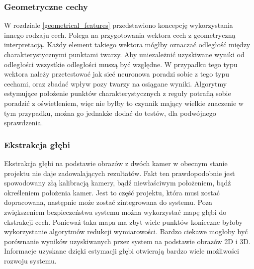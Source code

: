 \documentclass[oneside, eng]{mgr}
\begin{document}
\subsubsection{Geometryczne cechy}
W rozdziale \ref{geometrical_features} przedstawiono koncepcję wykorzystania innego rodzaju cech. Polega na przygotowania wektora cech z geometryczną interpretacją. Każdy element takiego wektora mógłby oznaczać odległość między charakterystycznymi punktami twarzy. Aby uniezależnić uzyskiwane wyniki od odległości wszystkie odległości muszą być względne. W przypadku tego typu wektora należy przetestować jak sieć neuronowa poradzi sobie z tego typu cechami, oraz zbadać wpływ pozy twarzy na osiągane wyniki. Algorytmy estymujące położenie punktów charakterystycznych z reguły potrafią sobie poradzić z oświetleniem, więc nie byłby to czynnik mający wielkie znaczenie w tym przypadku, można go jednakże dodać do testów, dla podwójnego sprawdzenia.

\subsubsection{Ekstrakcja głębi}
Ekstrakcja głębi na podstawie obrazów z dwóch kamer w obecnym stanie projektu nie daje zadowalających rezultatów. Fakt ten prawdopodobnie jest spowodowany złą kalibracją kamery, bądź niewłaściwym położeniem, bądź określeniem położenia kamer. Jest to część projektu, która musi zostać dopracowana, następnie może zostać zintegrowana do systemu. Poza zwiększeniem bezpieczeństwa systemu można wykorzystać mapę głębi do ekstrakcji cech. Ponieważ taka mapa ma zbyt wiele punktów konieczne byłoby wykorzystanie algorytmów redukcji wymiarowości. Bardzo ciekawe mogłoby być porównanie wyników uzyskiwanych przez system na podstawie obrazów 2D i 3D. Informacje uzyskane dzięki estymacji głębi otwierają bardzo wiele możliwości rozwoju systemu.
\end{document}
